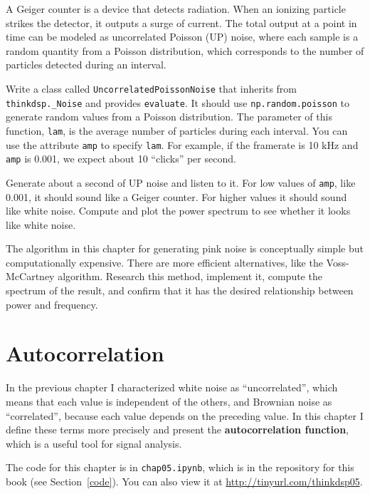 \documentclass[12pt]{book}
\begin{document}
\begin{exercise}
A Geiger counter is a device that detects radiation.
When an ionizing particle strikes the detector, it outputs a surge of
current.  The total output at a point in time can be modeled as
uncorrelated Poisson (UP) noise, where each sample is
a random quantity from a Poisson distribution, which corresponds to the
number of particles detected during an interval.

Write a class called {\tt UncorrelatedPoissonNoise} that inherits
from \verb"thinkdsp._Noise" and provides {\tt evaluate}.  It should
use {\tt np.random.poisson} to generate random values from a Poisson
distribution.  The parameter of this function, {\tt lam}, is the
average number of particles during each interval.  You can use the
attribute {\tt amp} to specify {\tt lam}.  For example, if the
framerate is 10 kHz and {\tt amp} is 0.001, we expect about 10
``clicks'' per second.

Generate about a second of UP noise and listen to it.  For low values
of {\tt amp}, like 0.001, it should sound like a Geiger counter.  For
higher values it should sound like white noise.  Compute and plot the
power spectrum to see whether it looks like white noise.
\end{exercise}


\begin{exercise}
The algorithm in this chapter for generating pink noise is
conceptually simple but computationally expensive.  There are
more efficient alternatives, like the Voss-McCartney algorithm.
Research this method, implement it, compute the spectrum of
the result, and confirm that it has the desired relationship
between power and frequency.
\end{exercise}


\chapter{Autocorrelation}

In the previous chapter I characterized white noise as ``uncorrelated'',
which means that each value is independent of the others, and Brownian
noise as ``correlated'', because each value depends on the preceding
value.  In this chapter I define these terms more precisely and
present the {\bf autocorrelation function}, which is a useful tool
for signal analysis.

The code for this chapter is in {\tt chap05.ipynb}, which is in the
repository for this book (see Section~\ref{code}).
You can also view it at \url{http://tinyurl.com/thinkdsp05}.
\end{document}
